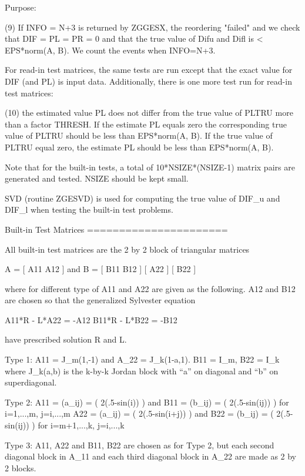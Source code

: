 \begin{DoxyParagraph}{Purpose\+: }
\begin{DoxyVerb}
 (9)   If INFO = N+3 is returned by ZGGESX, the reordering "failed"
       and we check that DIF = PL = PR = 0 and that the true value of
       Difu and Difl is < EPS*norm(A, B). We count the events when
       INFO=N+3.

 For read-in test matrices, the same tests are run except that the
 exact value for DIF (and PL) is input data.  Additionally, there is
 one more test run for read-in test matrices:

 (10)  the estimated value PL does not differ from the true value of
       PLTRU more than a factor THRESH. If the estimate PL equals
       zero the corresponding true value of PLTRU should be less than
       EPS*norm(A, B). If the true value of PLTRU equal zero, the
       estimate PL should be less than EPS*norm(A, B).

 Note that for the built-in tests, a total of 10*NSIZE*(NSIZE-1)
 matrix pairs are generated and tested. NSIZE should be kept small.

 SVD (routine ZGESVD) is used for computing the true value of DIF_u
 and DIF_l when testing the built-in test problems.

 Built-in Test Matrices
 ======================

 All built-in test matrices are the 2 by 2 block of triangular
 matrices

          A = [ A11 A12 ]    and      B = [ B11 B12 ]
              [     A22 ]                 [     B22 ]

 where for different type of A11 and A22 are given as the following.
 A12 and B12 are chosen so that the generalized Sylvester equation

          A11*R - L*A22 = -A12
          B11*R - L*B22 = -B12

 have prescribed solution R and L.

 Type 1:  A11 = J_m(1,-1) and A_22 = J_k(1-a,1).
          B11 = I_m, B22 = I_k
          where J_k(a,b) is the k-by-k Jordan block with ``a'' on
          diagonal and ``b'' on superdiagonal.

 Type 2:  A11 = (a_ij) = ( 2(.5-sin(i)) ) and
          B11 = (b_ij) = ( 2(.5-sin(ij)) ) for i=1,...,m, j=i,...,m
          A22 = (a_ij) = ( 2(.5-sin(i+j)) ) and
          B22 = (b_ij) = ( 2(.5-sin(ij)) ) for i=m+1,...,k, j=i,...,k

 Type 3:  A11, A22 and B11, B22 are chosen as for Type 2, but each
          second diagonal block in A_11 and each third diagonal block
          in A_22 are made as 2 by 2 blocks.


\end{DoxyVerb}
\end{DoxyParagraph}
